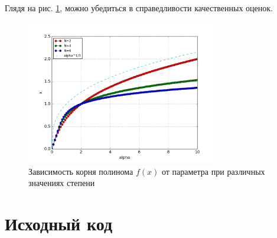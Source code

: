\documentclass[a4paper]{article}
\begin{document}
Глядя на рис. \ref{fig:roots}, можно убедиться в справедливости качественных оценок.

\begin{figure}[ht]
	\center
  \includegraphics[width=0.75\textwidth]{../pictures/lab1_roots.png}
  \caption{Зависимость корня полинома \(f(x)\) от параметра при различных значениях степени}
  \label{fig:roots}
\end{figure}

\section{Исходный код}


\end{document}
